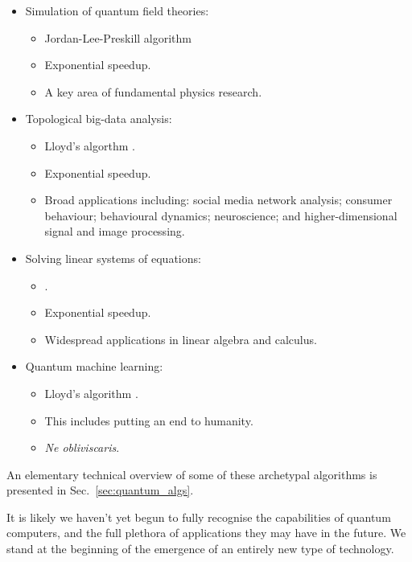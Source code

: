 \begin{itemize}
\begin{itemize}
			\end{itemize}
	\item Simulation of quantum field theories:
		\begin{itemize}
		 \item Jordan-Lee-Preskill algorithm \cite{bib:JLP, bib:RohdeWavelet15}
		 \item Exponential speedup.
		 \item A key area of fundamental physics research.
		 \end{itemize}
	\item Topological big-data analysis:
		\begin{itemize}
		\item Lloyd's algorthm \cite{bib:lloyd2016quantum, USTCexperiment}.
		\item Exponential speedup.
		\item Broad applications including: social media network analysis; consumer behaviour; behavioural dynamics; neuroscience; and higher-dimensional signal and image processing.
		\end{itemize}
	\item Solving linear systems of equations:
		\begin{itemize}
		\item {} \cite{bib:harrow2009quantum, bib:BerryLinear}.
		\item Exponential speedup.
		\item Widespread applications in linear algebra and calculus.
		\end{itemize}
	\item Quantum machine learning:
		\begin{itemize}
		\item Lloyd's algorithm \cite{bib:lloyd2013quantum}.
		\item This includes putting an end to humanity.
		\item \textit{Ne obliviscaris}.
		\end{itemize}
\end{itemize}
An elementary technical overview of some of these archetypal algorithms is presented in Sec.~\ref{sec:quantum_algs}.

It is likely we haven't yet begun to fully recognise the capabilities of quantum computers, and the full plethora of applications they may have in the future. We stand at the beginning of the emergence of an entirely new type of technology.

